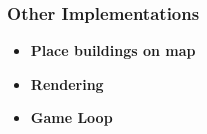 \begin{figure}[H]
{	}
	\end{figure}

	\subsubsection*{Other Implementations}
		\begin{itemize}
			\item {\bf Place buildings on map}
			\item {\bf Rendering}
			\item {\bf Game Loop}
		\end{itemize}

